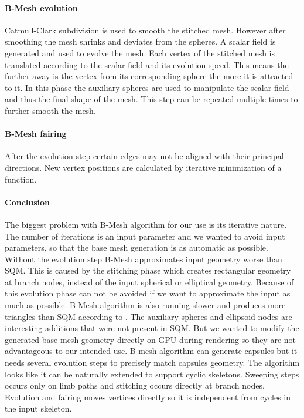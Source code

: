 \paragraph{B-Mesh evolution}
Catmull-Clark subdivision is used to smooth the stitched mesh. However after smoothing the mesh shrinks and deviates from the spheres. A scalar field is generated and used to evolve the mesh. Each vertex of the stitched mesh is translated according to the scalar field and its evolution speed. This means the further away is the vertex from its corresponding sphere the more it is attracted to it. In this phase the auxiliary spheres are used to manipulate the scalar field and thus the final shape of the mesh. This step can be repeated multiple times to further smooth the mesh.

\paragraph{B-Mesh fairing}
After the evolution step certain edges may not be aligned with their principal directions. New vertex positions are calculated by iterative minimization of a function.

\paragraph{Conclusion}
The biggest problem with B-Mesh algorithm for our use is its iterative nature. The number of iterations is an input parameter and we wanted to avoid input parameters, so that the base mesh generation is as automatic as possible. Without the evolution step B-Mesh approximates input geometry worse than SQM. This is caused by the stitching phase which creates rectangular geometry at branch nodes, instead of the input spherical or elliptical geometry. Because of this evolution phase can not be avoided if we want to approximate the input as much as possible.
B-Mesh algorithm is also running slower and produces more triangles than SQM according to \cite{sqm}. The auxiliary spheres and ellipsoid nodes are interesting additions that were not present in SQM. But we wanted to modify the generated base mesh geometry directly on GPU during rendering so they are not advantageous to our intended use. B-mesh algorithm can generate capsules but it needs several evolution steps to precisely match capsules geometry. The algorithm looks like it can be naturally extended to support cyclic skeletons. Sweeping steps occurs only on limb paths and stitching occurs directly at branch nodes. Evolution and fairing moves vertices directly so it is independent from cycles in the input skeleton.

